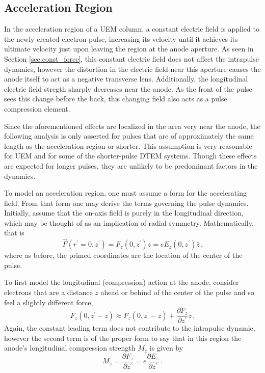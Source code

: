 
\subsection{Acceleration Region} \label{sec:gun_model}

In the acceleration region of a UEM column, a constant electric field is applied to the newly created electron pulse, increasing its velocity until it achieves its ultimate velocity just upon leaving the region at the anode aperture.
As seen in Section \ref{sec:const_force}, this constant electric field does not affect the intrapulse dynamics, however the distortion in the electric field near this aperture causes the anode itself to act as a negative transverse lens. %
Additionally, the longitudinal electric field stregth sharply decreases near the anode.
As the front of the pulse sees this change before the back, this changing field also acts as a pulse compression element.

Since the aforementioned effects are localized in the area very near the anode, the following analysis is only asserted for pulses that are of approximately the same length as the acceleration region or shorter.
This assumption is very reasonable for UEM and for some of the shorter-pulse DTEM systems.
Though these effects are expected for longer pulses, they are unlikely to be predominant factors in the dynamics.

To model an acceleration region, one must assume a form for the accelerating field.
From that form one may derive the terms governing the pulse dynamics. Initially, assume that the on-axis field is purely in the longitudinal direction, which may be thought of as an implication of radial symmetry.
Mathematically, that is
\begin{equation}
  \vec{F}(r^{\prime}=0,z^{\prime}) = F_z (0,z^{\prime}) \hat{z} = e E_z (0,z^{\prime}) \hat{z} \,\text{,}
\end{equation}
where as before, the primed coordinates are the location of the center of the pulse.

To first model the longitudinal (compression) action at the anode, %
consider electrons that are a distance $z$ ahead or behind of the center of the pulse and so feel a slightly different force, 
\begin{equation}
  F_z(0,z^{\prime} - z) \approx F_z(0,z^{\prime} - z) + \frac{\partial F_z}{\partial z^{\prime}} z \,\text{,}
\end{equation}
Again, the constant leading term does not contribute to the intrapulse dynamic, however the second term is of the proper form to say that in this region the anode's longitudinal compression strength $M_z$ is given by
\begin{equation}
  M_z = \frac{\partial F_z}{\partial z^{\prime}} = e \frac{\partial E_z}{\partial z^{\prime}} \, \text{.}
\end{equation}

